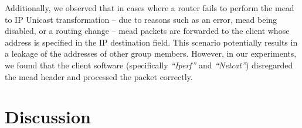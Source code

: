 Additionally, we observed that in cases where a router fails to perform the
    \gls{mead} to IP Unicast transformation -- due to reasons such as an error,
    \gls{mead} being disabled, or a routing change -- \gls{mead} packets are
    forwarded to the client whose address is specified in the IP destination
    field.
This scenario potentially results in a leakage of the addresses of other
    group members.
However, in our experiments, we found that the client software (specifically
    \textit{``Iperf''} and \textit{``Netcat''}) disregarded the \gls{mead}
    header and processed the packet correctly.


\section{Discussion} %
\label{sec:Discussion}










